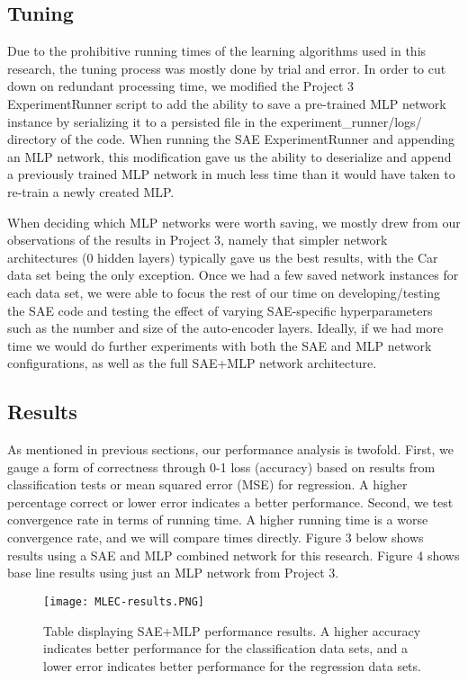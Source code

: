 \documentclass[twoside,11pt]{article}
\begin{document}
    \subsection{Tuning}
    
    Due to the prohibitive running times of the learning algorithms used in this research, the tuning process was mostly done by trial and error. In order to cut down on redundant processing time, we modified the Project 3 ExperimentRunner script to add the ability to save a pre-trained MLP network instance by serializing it to a persisted file in the experiment\_runner/logs/ directory of the code. When running the SAE ExperimentRunner and appending an MLP network, this modification gave us the ability to deserialize and append a previously trained MLP network in much less time than it would have taken to re-train a newly created MLP.
    
    When deciding which MLP networks were worth saving, we mostly drew from our observations of the results in Project 3, namely that simpler network architectures (0 hidden layers) typically gave us the best results, with the Car data set being the only exception. Once we had a few saved network instances for each data set, we were able to focus the rest of our time on developing/testing the SAE code and testing the effect of varying SAE-specific hyperparameters such as the number and size of the auto-encoder layers. Ideally, if we had more time we would do further experiments with both the SAE and MLP network configurations, as well as the full SAE+MLP network architecture.

    \subsection{Results}
    
    As mentioned in previous sections, our performance analysis is twofold. First, we gauge a form of correctness through 0-1 loss (accuracy) based on results from classification tests or mean squared error (MSE) for regression. A higher percentage correct or lower error indicates a better performance. Second, we test convergence rate in terms of running time. A higher running time is a worse convergence rate, and we will compare times directly. Figure 3 below shows results using a SAE and MLP combined network for this research. Figure 4 shows base line results using just an MLP network from Project 3.
    
    \begin{figure}[h]
        \centering
        \texttt{[image: MLEC-results.PNG]}
        \caption{Table displaying SAE+MLP performance results. A higher accuracy indicates better performance for the classification data sets, and a lower error indicates better performance for the regression data sets.}
        \label{fig:my_label}
    \end{figure}
    
\end{document}
